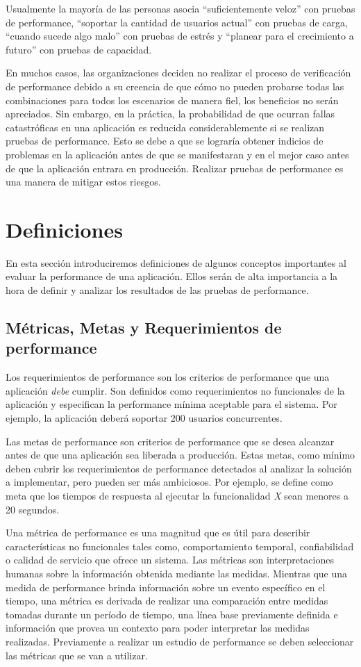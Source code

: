 	Usualmente la mayoría de las personas asocia ``suficientemente veloz'' con pruebas de performance, ``soportar la cantidad de usuarios actual'' con pruebas de carga, ``cuando
	sucede algo	malo'' con pruebas de estrés y ``planear para el crecimiento a futuro'' con pruebas de capacidad.

	En muchos casos, las organizaciones deciden no realizar el proceso de verificación de performance debido a su creencia de que cómo no pueden probarse todas las combinaciones para todos los escenarios de manera fiel, los beneficios no serán apreciados. Sin embargo, en la práctica, la
	probabilidad de que ocurran fallas catastróficas en una aplicación es reducida considerablemente si se realizan pruebas de performance. Esto se debe a que se lograría obtener indicios de problemas en la
	aplicación antes de que se manifestaran y en el mejor caso antes de que la aplicación entrara en producción. Realizar pruebas de performance es una manera de mitigar estos riesgos.


\section{ Definiciones }
\label{capitulo2:definiciones}
En esta sección introduciremos definiciones de algunos conceptos importantes al evaluar la performance de una aplicación. Ellos serán de alta importancia a la hora de definir y analizar los resultados de las pruebas de performance.
\subsection{Métricas, Metas y Requerimientos de performance}

Los requerimientos de performance son los criterios de performance que una aplicación \emph{debe} cumplir. Son definidos como requerimientos no funcionales de la aplicación y especifican la performance mínima aceptable para el sistema. Por ejemplo, la aplicación deberá soportar 200 usuarios concurrentes.

Las metas de performance son criterios de performance que se desea alcanzar antes de que una aplicación sea liberada a producción. Estas metas, como mínimo deben cubrir los requerimientos de performance detectados al analizar la solución a implementar, pero pueden ser más ambiciosos. Por ejemplo, se define como meta que los tiempos de respuesta al ejecutar la funcionalidad \emph{X} sean menores a 20 segundos.

Una métrica de performance es una magnitud que es útil para describir características no funcionales tales como, comportamiento temporal, confiabilidad o calidad de servicio que ofrece un sistema.
Las métricas son interpretaciones humanas sobre la información obtenida mediante las medidas. Mientras que una medida de performance brinda información sobre un evento específico en el tiempo, una métrica es derivada de realizar una comparación entre medidas tomadas durante un período de tiempo, una línea base previamente definida e información que provea un contexto para poder interpretar las medidas realizadas.
Previamente a realizar un estudio de performance se deben seleccionar las métricas que se van a utilizar. 

